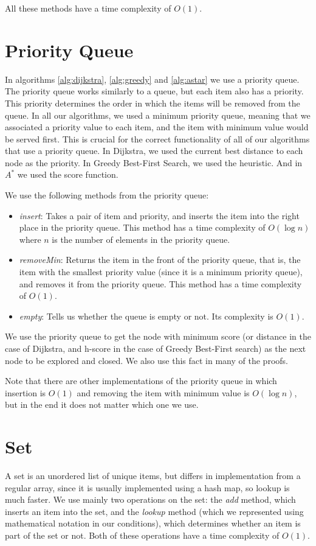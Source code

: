 \documentclass[a4paper,10pt]{report}
\begin{document}
\begin{appendices}
All these methods have a time complexity of $O(1)$.

\section{Priority Queue}
\label{annex:priorityqueue}
In algorithms \ref{alg:dijkstra}, \ref{alg:greedy} and \ref{alg:astar} we use a priority queue. The priority queue works similarly to a queue, but each item also has a priority. This priority determines the order in which the items will be removed from the queue. In all our algorithms, we used a minimum priority queue, meaning that we associated a priority value to each item, and the item with minimum value would be served first. This is crucial for the correct functionality of all of our algorithms that use a priority queue. In Dijkstra, we used the current best distance to each node as the priority. In Greedy Best-First Search, we used the heuristic. And in $A^*$ we used the score function.

We use the following methods from the priority queue:
\begin{itemize}
\item \emph{insert}: Takes a pair of item and priority, and inserts the item into the right place in the priority queue. This method has a time complexity of $O(\log n)$ where $n$ is the number of elements in the priority queue.
\item \emph{removeMin}: Returns the item in the front of the priority queue, that is, the item with the smallest priority value (since it is a minimum priority queue), and removes it from the priority queue. This method has a time complexity of $O(1)$.
\item \emph{empty}: Tells us whether the queue is empty or not. Its complexity is $O(1)$.
\end{itemize}

We use the priority queue to get the node with minimum score (or distance in the case of Dijkstra, and h-score in the case of Greedy Best-First search) as the next node to be explored and closed. We also use this fact in many of the proofs.

Note that there are other implementations of the priority queue in which insertion is $O(1)$ and removing the item with minimum value is $O(\log n)$, but in the end it does not matter which one we use.

\section{Set}
A set is an unordered list of unique items, but differs in implementation from a regular array, since it is usually implemented using a hash map, so lookup is much faster. We use mainly two operations on the set: the \emph{add} method, which inserts an item into the set, and the \emph{lookup} method (which we represented using mathematical notation in our conditions), which determines whether an item is part of the set or not. Both of these operations have a time complexity of $O(1)$.


\end{appendices}
\end{document}
